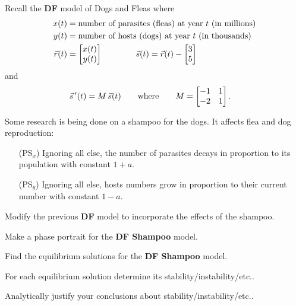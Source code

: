\documentclass{workbook}
\begin{document}
\begin{slide}
	\question
 		Recall the \textbf{DF} model of Dogs and Fleas where 
	\begin{align*}
		x(t) &= \text{number of parasites (fleas) at year $t$ (in millions)}\\
		y(t) &= \text{number of hosts (dogs) at year $t$ (in thousands)}\\
		\vec r(t) &= \mat{x(t)\\y(t)} \qquad\qquad
		\vec s(t) = \vec r(t) - \mat{3\\5}
	\end{align*}
	and
	\begin{align*}
		\vec s\,'(t) &= M\,\vec s(t)\qquad\text{where}\qquad M=\mat{-1&1\\-2&1}.
	\end{align*}

	Some research is being done on a shampoo for the dogs. It affects flea and dog reproduction:
	\begin{itemize}
		\item[(PS$_x$)] Ignoring all else, the number of parasites decays in proportion to its population with constant $1+a$.
		\item[(PS$_y$)] Ignoring all else, hosts numbers grow in proportion to their current number with constant $1-a$.
	\end{itemize}
	
	
	\begin{parts}
		\item Modify the previous \textbf{DF} model to incorporate the effects of the shampoo.
		\item Make a phase portrait for the \textbf{DF Shampoo} model.
		\item Find the equilibrium solutions for the \textbf{DF Shampoo} model.
		\item For each equilibrium solution determine its stability/instability/etc..
		\item Analytically justify your conclusions about stability/instability/etc..
	\end{parts}
\end{slide}

%
%
\end{document}

